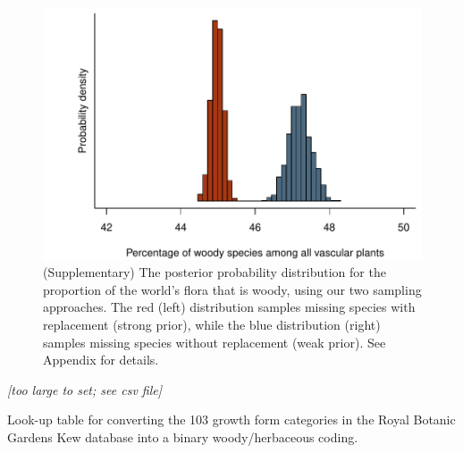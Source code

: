 \documentclass[a4paper,12pt]{article}
\begin{document}
\begin{figure}[p]
  \centering
  \includegraphics{figs/distribution-raw}  
  \caption{(Supplementary) The posterior probability distribution for
    the proportion of the world's flora that is woody, using our two
    sampling approaches.  The red (left) distribution samples missing species
    with replacement (strong prior), while the blue distribution
    (right) samples missing species without replacement (weak prior).
    See Appendix for details.}
  \label{fig:distribution-raw}
\end{figure}

\begin{table}[p]
  \centering
  \textit{[too large to set; see csv file]}
  \caption{Look-up table for converting the 103 growth form categories
    in the Royal Botanic Gardens Kew database into a binary
woody/herbaceous coding.}
\label{tab:kew}
\end{table}
\end{document}
